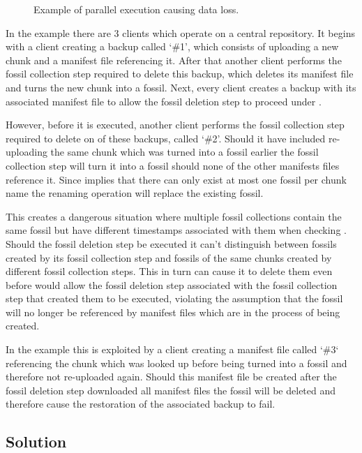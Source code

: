 \begin{figure}[H]
    
    \caption{Example of parallel execution causing data loss.}\label{fig:race-candition}
\end{figure}

In the example there are 3 clients which operate on a central repository.
It begins with a client creating a backup called `\#1', which consists of uploading
a new chunk and a manifest file referencing it.
After that another client performs the fossil collection step required to delete
this backup, which deletes its manifest file and turns the new chunk into a fossil.
Next, every client creates a backup with its associated manifest file to allow the
fossil deletion step to proceed under .

However, before it is executed, another client performs the fossil collection step
required to delete on of these backups, called `\#2'.
Should it have included re-uploading the same chunk which was turned into a fossil
earlier the fossil collection step will turn it into a fossil should none of
the other manifests files reference it.
Since  implies that there can only exist at most one fossil per chunk
name the renaming operation will replace the existing fossil.

This creates a dangerous situation where multiple fossil collections contain the same
fossil but have different timestamps associated with them when checking .
Should the fossil deletion step be executed it can't distinguish between fossils created
by its fossil collection step and fossils of the same chunks created by different fossil
collection steps.
This in turn can cause it to delete them even before  would allow the
fossil deletion step associated with the fossil collection step that created them
to be executed, violating the assumption that the fossil will no longer be referenced
by manifest files which are in the process of being created.

In the example this is exploited by a client creating a manifest file called `\#3` referencing
the chunk which was looked up before being turned into a fossil and therefore not re-uploaded
again.
Should this manifest file be created after the fossil deletion step downloaded
all manifest files the fossil will be deleted and therefore cause the restoration
of the associated backup to fail.

\subsection{Solution}

